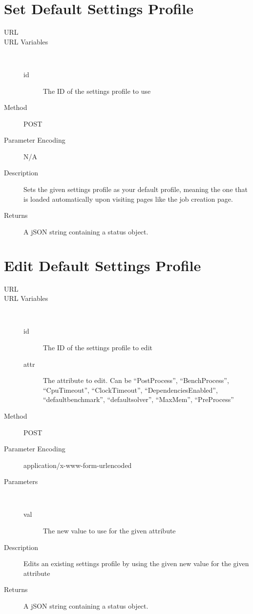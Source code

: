 \section{Set Default Settings Profile}
\begin{description}
\item [URL] 
\item [URL Variables] \
	\begin{description}
	\item [id]  The ID of the settings profile to use
	\end{description}
\item [Method] POST
\item [Parameter Encoding] N/A
\item [Description] Sets the given settings profile as your default profile, meaning the one that is loaded automatically upon visiting pages like the job creation page.
\item [Returns] A jSON string containing a status object.
\end{description}


\section{Edit Default Settings Profile}
\begin{description}
\item [URL] 
\item [URL Variables] \
	\begin{description}
	\item [id]  The ID of the settings profile to edit
	\item [attr]  The attribute to edit. Can be “PostProcess”, “BenchProcess”, “CpuTimeout”, “ClockTimeout”, “DependenciesEnabled”, “defaultbenchmark”, “defaultsolver”, “MaxMem”, “PreProcess”
	\end{description}
\item [Method] POST
\item [Parameter Encoding] application/x-www-form-urlencoded
\item [Parameters] \
	\begin{description}
	\item [val]  The new value to use for the given attribute
	\end{description}
\item [Description] Edits an existing settings profile by using the given new value for the given attribute
\item [Returns] A jSON string containing a status object.
\end{description}


